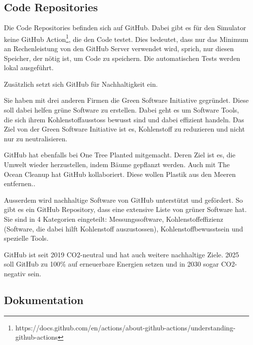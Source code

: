 \subsection{Code Repositories}

Die Code Repositories befinden sich auf GitHub. Dabei gibt es für den Simulator keine GitHub Action\footnote{https://docs.github.com/en/actions/about-github-actions/understanding-github-actions}, die den Code testet. Dies bedeutet, dass nur das Minimum an Rechenleistung von den GitHub Server verwendet wird, sprich, nur diesen Speicher, der nötig ist, um Code zu speichern. Die automatischen Tests werden lokal ausgeführt.

Zusätzlich setzt sich GitHub für Nachhaltigkeit ein.\cite{github-sustainability}

Sie haben mit drei anderen Firmen die Green Software Initiative gegründet. Diese soll dabei helfen grüne Software zu erstellen.  Dabei geht es um Software Tools, die sich ihrem Kohlenstoffausstoss bewusst sind und dabei effizient handeln. Das Ziel von der Green Software Initiative ist es, Kohlenstoff zu reduzieren und nicht nur zu neutralisieren.\cite{green-software-initiative}

GitHub hat ebenfalls bei One Tree Planted mitgemacht. Deren Ziel ist es, die Umwelt wieder herzustellen, indem Bäume gepflanzt werden\cite{one-tree-planted}. Auch mit The Ocean Cleanup hat GitHub kollaboriert. Diese wollen Plastik aus den Meeren entfernen.\cite{ocean-cleanup}.

Ausserdem wird nachhaltige Software von GitHub unterstützt und gefördert. So gibt es ein GitHub Repository, dass eine extensive Liste von grüner Software hat. Sie sind in 4 Kategorien eingeteilt: Messungssoftware, Kohlenstoffeffizienz (Software, die dabei hilft Kohlenstoff auszustossen), Kohlenstoffbewusstsein und spezielle Tools. \cite{green-software}

GitHub ist seit 2019 CO2-neutral und hat auch weitere nachhaltige Ziele. 2025 soll GitHub zu 100\% auf erneuerbare Energien setzen und in 2030 sogar CO2-negativ sein.\cite{github-goals}







\subsection{Dokumentation}

